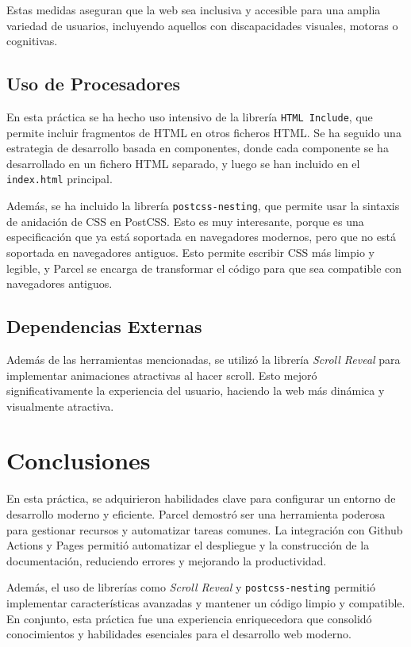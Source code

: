 \documentclass{article}
\begin{document}
Estas medidas aseguran que la web sea inclusiva y accesible para una amplia variedad de usuarios, incluyendo aquellos con discapacidades visuales, motoras o cognitivas.

\subsection{Uso de Procesadores}\label{subsec:uso-de-procesadores}

En esta práctica se ha hecho uso intensivo de la librería \texttt{HTML Include}, que permite incluir fragmentos de HTML en otros ficheros HTML. Se ha seguido una estrategia de desarrollo basada en componentes, donde cada componente se ha desarrollado en un fichero HTML separado, y luego se han incluido en el \texttt{index.html} principal.

Además, se ha incluido la librería \texttt{postcss-nesting}, que permite usar la sintaxis de anidación de CSS en PostCSS. Esto es muy interesante, porque es una especificación que ya está soportada en navegadores modernos, pero que no está soportada en navegadores antiguos. Esto permite escribir CSS más limpio y legible, y Parcel se encarga de transformar el código para que sea compatible con navegadores antiguos.

\subsection{Dependencias Externas}\label{subsec:dependencias-externas}

Además de las herramientas mencionadas, se utilizó la librería \textit{Scroll Reveal} para implementar animaciones atractivas al hacer scroll. Esto mejoró significativamente la experiencia del usuario, haciendo la web más dinámica y visualmente atractiva.

\section{Conclusiones}\label{sec:conclusiones}

En esta práctica, se adquirieron habilidades clave para configurar un entorno de desarrollo moderno y eficiente. Parcel demostró ser una herramienta poderosa para gestionar recursos y automatizar tareas comunes. La integración con Github Actions y Pages permitió automatizar el despliegue y la construcción de la documentación, reduciendo errores y mejorando la productividad.

Además, el uso de librerías como \textit{Scroll Reveal} y \texttt{postcss-nesting} permitió implementar características avanzadas y mantener un código limpio y compatible. En conjunto, esta práctica fue una experiencia enriquecedora que consolidó conocimientos y habilidades esenciales para el desarrollo web moderno.
\end{document}
